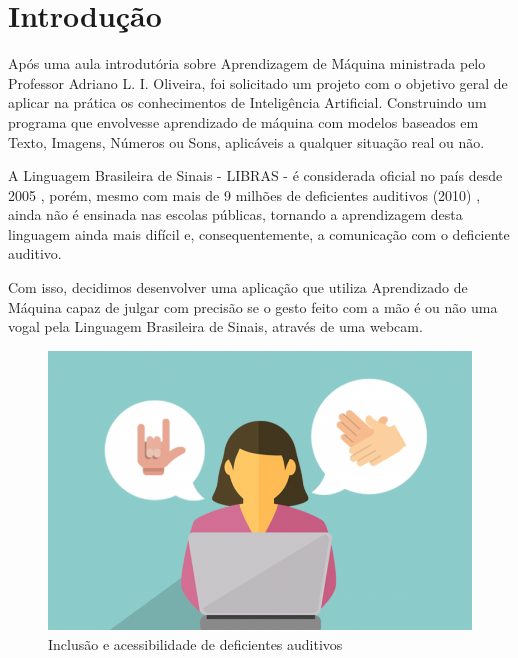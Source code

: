 \documentclass[a4paper, 12pt]{article}
\begin{document}
\newpage
\tableofcontents
\thispagestyle{empty}

\newpage
{}

\section{Introdução}

Após uma aula introdutória sobre Aprendizagem de Máquina ministrada pelo Professor Adriano L. I. Oliveira, foi solicitado um projeto com o objetivo geral de aplicar na prática os conhecimentos de Inteligência Artificial. Construindo um programa que envolvesse aprendizado de máquina com modelos baseados em Texto, Imagens, Números ou Sons, aplicáveis a qualquer situação real ou não.

A Linguagem Brasileira de Sinais - LIBRAS - é considerada oficial no país desde 2005 \cite{planalto}, porém, mesmo com mais de 9 milhões de deficientes auditivos (2010) \cite{ibge}, ainda não é ensinada nas escolas públicas, tornando a aprendizagem desta linguagem ainda mais difícil e, consequentemente, a comunicação com o deficiente auditivo.

Com isso, decidimos desenvolver uma aplicação que utiliza Aprendizado de Máquina capaz de julgar com precisão se o gesto feito com a mão é ou não uma vogal pela Linguagem Brasileira de Sinais, através de uma webcam.

\begin{figure}[!ht]
\centering
\includegraphics[scale=0.3]{img/inclusion.png}
\caption{Inclusão e acessibilidade de deficientes auditivos\cite{figure_1}}
\label{figure_1}
\end{figure}
\end{document}
